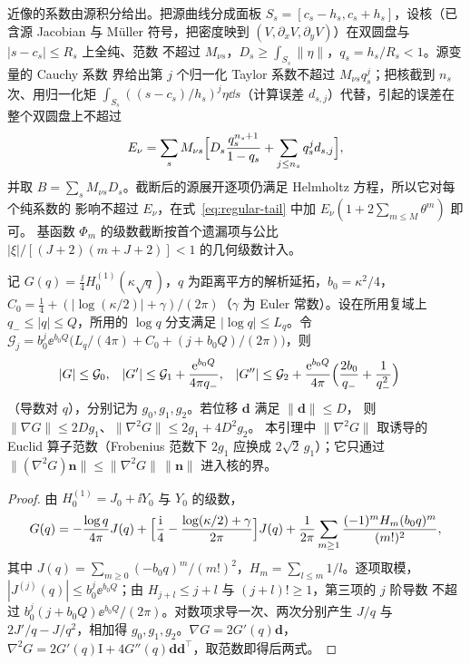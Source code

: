 近像的系数由源积分给出。把源曲线分成面板 $S_s=[c_s-h_s,c_s+h_s]$，设核（已含源 Jacobian 与
Müller 符号，把密度映到 $(V,\partial_xV,\partial_yV)$）在双圆盘与 $|s-c_s|\leq R_s$ 上全纯、范数
不超过 $M_{\nu s}$，$D_s\geq\int_{S_s}\lVert\eta\rVert$，$q_s=h_s/R_s<1$。源变量的 Cauchy 系数
界给出第 $j$ 个归一化 Taylor 系数不超过 $M_{\nu s}q_s^j$；把核截到 $n_s$ 次、用归一化矩
$\int_{S_s}((s-c_s)/h_s)^j\eta\dd s$（计算误差 $d_{s,j}$）代替，引起的误差在整个双圆盘上不超过
\begin{align}
  E_\nu=\sum_sM_{\nu s}\Bigl[D_s\frac{q_s^{n_s+1}}{1-q_s}+\sum_{j\le n_s}q_s^jd_{s,j}\Bigr],
  \label{eq:source-moment-error}
\end{align}
并取 $B=\sum_sM_{\nu s}D_s$。截断后的源展开逐项仍满足 Helmholtz 方程，所以它对每个纯系数的
影响不超过 $E_\nu$，在式~\eqref{eq:regular-tail} 中加 $E_\nu(1+2\sum_{m\le M}\theta^m)$ 即可。
基函数 $\Phi_m$ 的级数截断按首个遗漏项与公比 $|\xi|/[(J+2)(m+J+2)]<1$ 的几何级数计入。

\begin{lemma}[基本解的包络]
  \label{lem:green-envelope}
  记 $G(q)=\frac{\ii}{4}H_0^{(1)}(\kappa\sqrt q)$，$q$ 为距离平方的解析延拓，$b_0=\kappa^2/4$，
  $C_0=\frac14+(|\log(\kappa/2)|+\gamma)/(2\pi)$（$\gamma$ 为 Euler 常数）。设在所用复域上
  $q_-\leq|q|\leq Q$，所用的 $\log q$ 分支满足 $|\log q|\leq L_q$。令
  $\mathcal G_j=b_0^j\ee^{b_0Q}\bigl(L_q/(4\pi)+C_0+(j+b_0Q)/(2\pi)\bigr)$，则
  \begin{align*}
    |G|&\leq\mathcal G_0,
    &|G'|&\leq\mathcal G_1+\frac{\mathrm{e}^{b_0Q}}{4\pi q_-},
    &|G''|&\leq\mathcal G_2+\frac{\mathrm{e}^{b_0Q}}{4\pi}\Bigl(\frac{2b_0}{q_-}+\frac1{q_-^2}\Bigr)
  \end{align*}
  （导数对 $q$），分别记为 $g_0,g_1,g_2$。若位移 $\boldsymbol d$ 满足 $\lVert\boldsymbol d\rVert\leq D$，
  则 $\lVert\nabla G\rVert\leq2Dg_1$、$\lVert\nabla^2G\rVert\leq2g_1+4D^2g_2$。
  本引理中 $\lVert\nabla^2G\rVert$
  取诱导的 Euclid 算子范数（Frobenius 范数下 $2g_1$ 应换成 $2\sqrt2\,g_1$）；它只通过
  $\lVert(\nabla^2G)\boldsymbol n\rVert\leq\lVert\nabla^2G\rVert\,\lVert\boldsymbol n\rVert$ 进入核的界。
\end{lemma}

\begin{proof}
  由 $H_0^{(1)}=J_0+\ii Y_0$ 与 $Y_0$ 的级数，
  \begin{align*}
    G(q)=-\frac{\log q}{4\pi}J(q)+\Bigl[\frac{\mathrm{i}}{4}-\frac{\log(\kappa/2)+\gamma}{2\pi}\Bigr]J(q)
    +\frac1{2\pi}\sum_{m\geq1}\frac{(-1)^mH_m(b_0q)^m}{(m!)^2},
  \end{align*}
  其中 $J(q)=\sum_{m\ge0}(-b_0q)^m/(m!)^2$，$H_m=\sum_{l\le m}1/l$。逐项取模，
  $|J^{(j)}(q)|\leq b_0^j\ee^{b_0Q}$；由 $H_{j+l}\leq j+l$ 与 $(j+l)!\geq1$，第三项的 $j$ 阶导数
  不超过 $b_0^j(j+b_0Q)\ee^{b_0Q}/(2\pi)$。对数项求导一次、两次分别产生 $J/q$ 与
  $2J'/q-J/q^2$，相加得 $g_0,g_1,g_2$。$\nabla G=2G'(q)\boldsymbol d$，
  $\nabla^2G=2G'(q)\mathrm I+4G''(q)\boldsymbol d\boldsymbol d^{\top}$，取范数即得后两式。
\end{proof}

